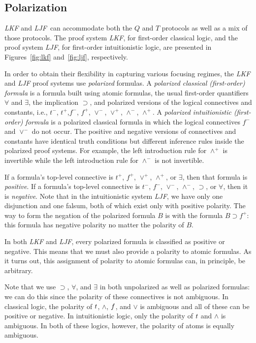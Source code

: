 \documentclass{easychair}
\newcommand\proofsystem[1]{\mbox{\slshape #1}\xspace}
\newcommand\LKF  {\proofsystem{LKF}}
\newcommand\LJF  {\proofsystem{LJF}}
\newcommand{\impl}{\supset}
\newcommand{\true }{t\/}
\newcommand{\false}{f\/}
\newcommand{\ntrue}{t^-}
\newcommand{\ptrue}{t^+}
\newcommand{\nfalse}{f^-}
\newcommand{\pfalse}{f^+}
\newcommand{\wedgep}{\wedge^{\!+}}
\newcommand{\wedgen}{\wedge^{\!-}}
\newcommand{\veep}{\vee^{\!+}}
\newcommand{\veen}{\vee^{\!-}}
\begin{document}
\subsection{Polarization}
\LKF and \LJF ~\cite{LiaMil09}can accommodate both the $Q$ and $T$ protocols as well
as a mix of those protocols.
The proof system \LKF, for first-order classical logic, and the
proof system \LJF, for first-order intuitionistic logic, are
presented in Figures~\ref{fig:lkf} and~\ref{fig:ljf}, respectively.

In order to obtain their flexibility in capturing various focusing
regimes, the \LKF and \LJF proof systems use \emph{polarized}
formulas.
A \emph{polarized classical (first-order) formula} is a formula built
using atomic formulas, 
the usual first-order quantifiers $\forall$ and $\exists$, the implication
$\impl$, and polarized versions of the logical connectives and
constants, i.e., $\ntrue$, $\ptrue$,$\nfalse$, $\pfalse$, $\veen$,
$\veep$, $\wedgen$, $\wedgep$.
A \emph{polarized intuitionistic (first-order) formula} is a polarized
classical formula in which the logical connectives $\nfalse$ and
$\veen$ do not occur.
The positive and negative versions of connectives and constants
have identical truth conditions but different inference rules
inside the polarized proof systems.
For example, the left introduction rule for $\wedgep$ is invertible
while the left introduction rule for $\wedgen$ is not invertible.



If a formula's top-level connective is $\ptrue$,
$\pfalse$, $\veep$, $\wedgep$, or $\exists$, then that formula is
\emph{positive}.
If a formula's top-level connective is $\ntrue$, $\nfalse$,
$\veen$, $\wedgen$, $\impl$, or $\forall$, then it is \emph{negative}.
Note that in the intuitionistic system \LJF, we have only one
disjunction and one falsum, both of which exist only with positive
polarity.
The way to form the negation of the polarized formula $B$ is with the
formula $B\impl\pfalse$: this formula has negative polarity no matter
the polarity of $B$.



In both \LKF and \LJF, every polarized formula is classified as
positive or negative.
This means that we must also provide a polarity to atomic formulas.
As it turns out, this assignment of polarity to atomic formulas can,
in principle, be arbitrary.


Note that we use $\impl$, $\forall$, and $\exists$ in both unpolarized
as well as polarized formulas: we can do this since the polarity of
these connectives is not ambiguous.
In classical logic, the polarity of $\true$, $\wedge$, $\false$, and
$\vee$ is ambiguous and all of these can be positive or negative.
In intuitionistic logic, only the polarity of $\true$ and $\wedge$
is ambiguous.
In both of these logics, however, the polarity of atoms is equally
ambiguous.
\end{document}
